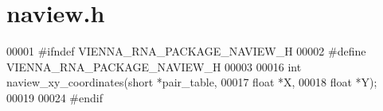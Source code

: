\hypertarget{naview_8h_source}{\section{naview.\+h}
\label{naview_8h_source}
}

\begin{DoxyCode}
00001 \textcolor{preprocessor}{#ifndef VIENNA\_RNA\_PACKAGE\_NAVIEW\_H}
00002 \textcolor{preprocessor}{#define VIENNA\_RNA\_PACKAGE\_NAVIEW\_H}
00003 
00016 \textcolor{keywordtype}{int} naview\_xy\_coordinates(\textcolor{keywordtype}{short} *pair\_table,
00017                           \textcolor{keywordtype}{float} *X,
00018                           \textcolor{keywordtype}{float} *Y);
00019 
00024 \textcolor{preprocessor}{#endif}
\end{DoxyCode}
